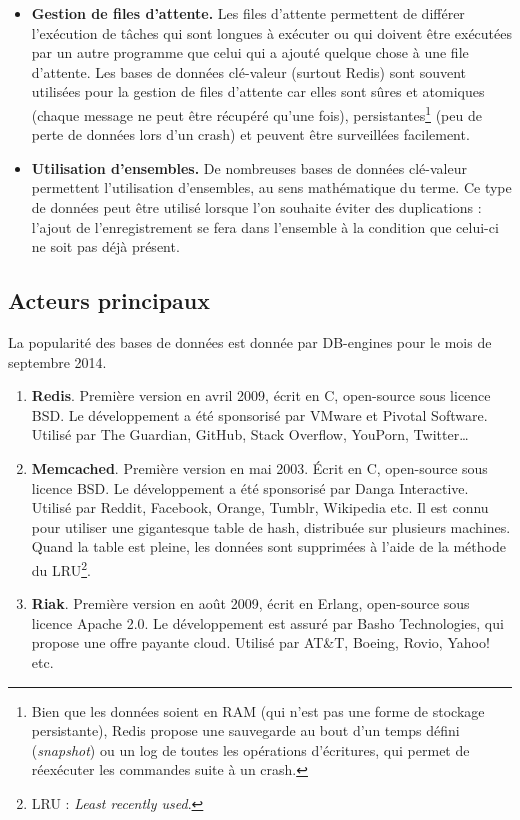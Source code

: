 \begin{itemize}
	 	\item \textbf{Gestion de files d'attente.} Les files d'attente permettent de différer l'exécution de tâches qui sont longues à exécuter ou qui doivent être exécutées par un autre programme que celui qui a ajouté quelque chose à une file d'attente. Les bases de données clé-valeur (surtout Redis) sont souvent utilisées pour la gestion de files d'attente car elles sont sûres et atomiques (chaque message ne peut être récupéré qu'une fois), persistantes\footnote{Bien que les données soient en RAM (qui n'est pas une forme de stockage persistante), Redis propose une sauvegarde au bout d'un temps défini (\textit{snapshot}) ou un log de toutes les opérations d'écritures, qui permet de réexécuter les commandes suite à un crash.} (peu de perte de données lors d'un crash) et peuvent être surveillées facilement.
	 	\item \textbf{Utilisation d'ensembles.} De nombreuses bases de données clé-valeur permettent l'utilisation d'ensembles, au sens mathématique du terme. Ce type de données peut être utilisé lorsque l'on souhaite éviter des duplications : l'ajout de l'enregistrement se fera dans l'ensemble à la condition que celui-ci ne soit pas déjà présent.
	 \end{itemize} 

\subsection{Acteurs principaux}
	La popularité des bases de données est donnée par DB-engines\cite{db_engines_key_value} pour le mois de septembre 2014.

	\begin{enumerate}
		\item \textbf{Redis}. Première version en avril 2009, écrit en C, open-source sous licence BSD. Le développement a été sponsorisé par VMware et Pivotal Software. Utilisé par The Guardian, GitHub, Stack Overflow, YouPorn, Twitter\dots\cite{Wikipedia_redis}
		\item \textbf{Memcached}. Première version en mai 2003. Écrit en C, open-source sous licence BSD. Le développement a été sponsorisé par Danga Interactive. Utilisé par Reddit, Facebook, Orange, Tumblr, Wikipedia etc. Il est connu pour utiliser une gigantesque table de hash, distribuée sur plusieurs machines. Quand la table est pleine, les données sont supprimées à l'aide de la méthode du LRU\footnote{LRU : \textit{Least recently used}.}.\cite{Wikipedia_memcached}
		\item \textbf{Riak}. Première version en août 2009, écrit en Erlang, open-source sous licence Apache 2.0. Le développement est assuré par Basho Technologies, qui propose une offre payante cloud. Utilisé par AT\&T, Boeing, Rovio, Yahoo! etc.\cite{Wikipedia_riak}
	\end{enumerate}
